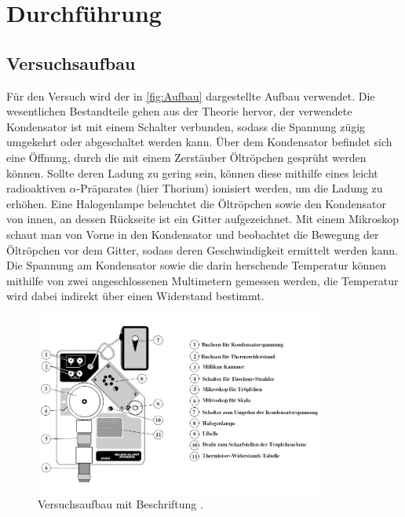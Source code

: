 \section{Durchführung}
\label{sec:Durchführung}

\subsection{Versuchsaufbau}
Für den Versuch wird der in \autoref{fig:Aufbau} dargestellte Aufbau verwendet.
Die wesentlichen Bestandteile gehen aus der Theorie hervor, der verwendete Kondensator
ist mit einem Schalter verbunden, sodass die Spannung zügig umgekehrt oder abgeschaltet werden kann.
Über dem Kondensator befindet sich eine Öffnung, durch die mit einem Zerstäuber Öltröpchen
gesprüht werden können.
Sollte deren Ladung zu gering sein, können diese mithilfe eines leicht radioaktiven $\alpha$-Präparates (hier Thorium)
ionisiert werden, um die Ladung zu erhöhen.
Eine Halogenlampe beleuchtet die Öltröpchen sowie den Kondensator von innen, an dessen Rückseite ist ein Gitter aufgezeichnet.
Mit einem Mikroskop schaut man von Vorne in den Kondensator und beobachtet die Bewegung der Öltröpchen vor dem Gitter,
sodass deren Geschwindigkeit ermittelt werden kann.
Die Spannung am Kondensator sowie die darin herschende Temperatur können mithilfe von zwei angeschlossenen Multimetern
gemessen werden, die Temperatur wird dabei indirekt über einen Widerstand bestimmt.
\begin{figure} [H]
    \centering
    \includegraphics[height=6cm]{content/pics/Aufbau.jpg}
    \caption{Versuchsaufbau mit Beschriftung \cite{v503}.}
    \label{fig:Aufbau}
\end{figure}

